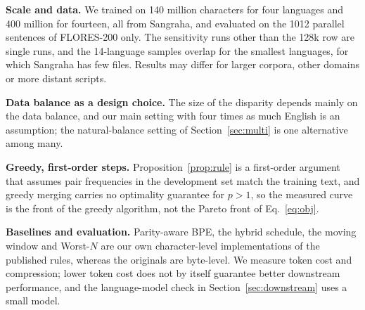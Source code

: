 \noindent\textbf{Scale and data.} We trained on 140 million characters for four languages and
400 million for fourteen, all from Sangraha, and evaluated on the 1012 parallel sentences
of FLORES-200 only. The sensitivity runs other than the 128k row are single runs, and the
14-language samples overlap for the smallest languages, for which Sangraha has few files.
Results may differ for larger corpora, other domains or more distant scripts.

\noindent\textbf{Data balance as a design choice.} The size of the disparity depends mainly
on the data balance, and our main setting with four times as much English is an assumption;
the natural-balance setting of Section~\ref{sec:multi} is one alternative among many.

\noindent\textbf{Greedy, first-order steps.} Proposition~\ref{prop:rule} is a first-order
argument that assumes pair frequencies in the development set match the training text, and
greedy merging carries no optimality guarantee for $p>1$, so the measured curve is the front
of the greedy algorithm, not the Pareto front of Eq.~\eqref{eq:obj}.

\noindent\textbf{Baselines and evaluation.} Parity-aware BPE, the hybrid schedule, the moving
window and Worst-$N$ are our own character-level implementations of the published rules,
whereas the originals are byte-level. We measure token cost and compression; lower token
cost does not by itself guarantee better downstream performance, and the language-model
check in Section~\ref{sec:downstream} uses a small model.